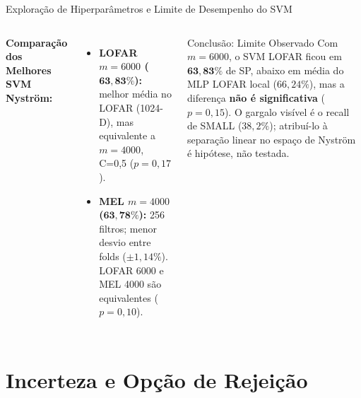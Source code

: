 \documentclass[aspectratio=169]{beamer}
\begin{document}
\begin{frame}{Explora\c{c}\~{a}o de Hiperpar\^{a}metros e Limite de Desempenho do SVM}
    \vspace{0.1cm}
    \begin{columns}
        \textbf{Compara\c{c}\~{a}o dos Melhores SVM Nystr\"{o}m:}
        \begin{itemize}
            \item \textbf{LOFAR $m=6000$ ($\mathbf{63,83\%}$):} melhor m\'{e}dia no LOFAR (1024-D), mas equivalente a $m=4000$, C=0,5 ($p=0,17$).
            \item \textbf{MEL $m=4000$ ($\mathbf{63,78\%}$):} 256 filtros; menor desvio entre folds ($\pm 1,14\%$). LOFAR 6000 e MEL 4000 s\~{a}o equivalentes ($p=0,10$).
        \end{itemize}

        \begin{alertblock}{Conclus\~{a}o: Limite Observado}
            Com $m=6000$, o SVM LOFAR ficou em $\mathbf{63,83\%}$ de SP, abaixo em m\'{e}dia do MLP LOFAR local ($66,24\%$), mas a diferen\c{c}a \textbf{n\~{a}o \'{e} significativa} ($p=0,15$). O gargalo vis\'{i}vel \'{e} o recall de SMALL ($38,2\%$); atribu\'{i}-lo \`{a} separa\c{c}\~{a}o linear no espa\c{c}o de Nystr\"{o}m \'{e} hip\'{o}tese, n\~{a}o testada.
        \end{alertblock}
    \end{columns}
\end{frame}

\section{Incerteza e Op\c{c}\~{a}o de Rejei\c{c}\~{a}o}
\end{document}
